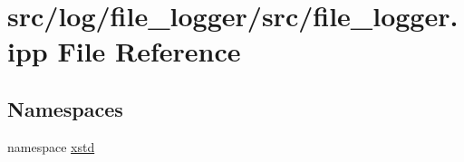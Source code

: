 \hypertarget{file__logger_8ipp}{\section{src/log/file\-\_\-logger/src/file\-\_\-logger.ipp File Reference}
\label{file__logger_8ipp}
}
\subsection*{Namespaces}
\begin{DoxyCompactItemize}
\item 
namespace \hyperlink{namespacexstd}{xstd}
\end{DoxyCompactItemize}
